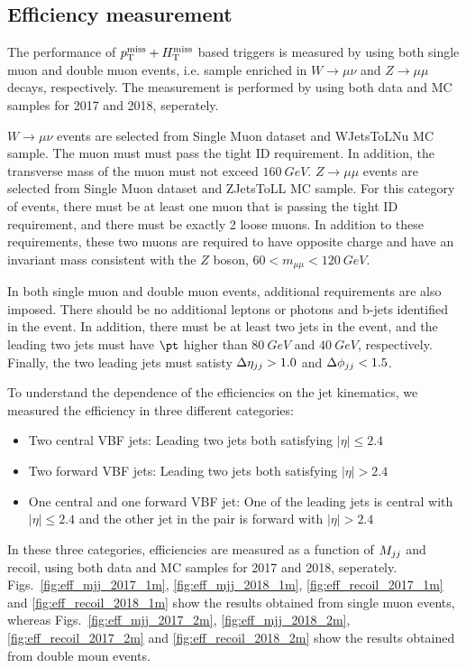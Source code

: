 \subsection{Efficiency measurement}

The performance of $p_{\mathrm{T}}^{\mathrm{miss}} + H_{\mathrm{T}}^{\mathrm{miss}}$ based triggers is measured by using both single muon and double muon events, i.e. sample enriched in
$W \rightarrow \mu\nu$ and $Z \rightarrow \mu\mu$ decays, respectively. The measurement is performed by using both data and MC samples 
for 2017 and 2018, seperately.

$W \rightarrow \mu\nu$ events are selected from Single Muon dataset and WJetsToLNu MC sample. %
The muon must must pass the tight ID requirement. In addition, the transverse mass of the muon must not exceed $160 \ GeV$. 
$Z \rightarrow \mu\mu$ events are selected from Single Muon dataset and ZJetsToLL MC sample. %
For this category of events, there must be at least one muon that is passing the tight ID requirement, and there must be exactly 
2 loose muons. In addition to these requirements, these two muons are required to have opposite charge and have an invariant mass 
consistent with the $Z$ boson, $60 < m_{\mu\mu} < 120 \ GeV$.

In both single muon and double muon events, additional requirements are also imposed. There should be no additional leptons or photons and
b-jets identified in the event. In addition, there must be at least two jets in the event, and the leading two jets must have $\pt$ higher
than $80 \ GeV$ and $40 \ GeV$, respectively. Finally, the two leading jets must satisty $\Delta \eta_{jj} > 1.0$ and $\Delta \phi_{jj} < 1.5$.

To understand the dependence of the efficiencies on the jet kinematics, we measured the efficiency in three different categories:

\begin{itemize}
    \item Two central VBF jets: Leading two jets both satisfying $|\eta| \leq 2.4$
    \item Two forward VBF jets: Leading two jets both satisfying $|\eta| > 2.4$
    \item One central and one forward VBF jet: One of the leading jets is central with $|\eta| \leq 2.4$ and the other jet in the pair is forward 
    with $|\eta| > 2.4$
\end{itemize}

In these three categories, efficiencies are measured as a function of $M_{jj}$ and recoil, using both data and MC samples for 2017 and 2018,
seperately. Figs.~\ref{fig:eff_mjj_2017_1m}, \ref{fig:eff_mjj_2018_1m}, \ref{fig:eff_recoil_2017_1m} and \ref{fig:eff_recoil_2018_1m} show 
the results obtained from single muon events, whereas Figs.~\ref{fig:eff_mjj_2017_2m}, \ref{fig:eff_mjj_2018_2m}, 
\ref{fig:eff_recoil_2017_2m} and \ref{fig:eff_recoil_2018_2m} show the results obtained from double moun events.

